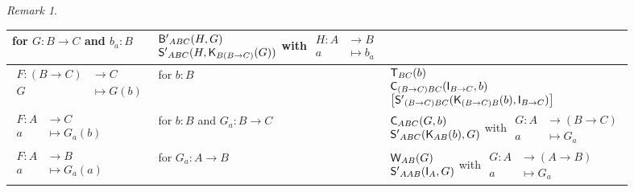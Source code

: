 \documentclass[a4paper]{article}
\theoremstyle{definition}
\theoremstyle{remark}
\newtheorem*{remark}{Remark}
\newcommand{\nm}{\mathsf}
\newcommand{\combinator}{\nm}
\newcommand{\idFun}{\combinator{I}}
\newcommand{\appFun}{\combinator{T}}
\newcommand{\constFun}{\combinator{K}}
\newcommand{\compFun}{\combinator{B'}}
\newcommand{\swapFun}{\combinator{C}}
\newcommand{\dupFun}{\combinator{W}}
\newcommand{\substFun}{\combinator{S'}}
\begin{document}
\begin{remark}
\begin{longtable}{ll|l}
    \parbox{3cm}{for $G : B \to C$ \\ and $b_a : B$} &
    $\begin{array}{@{}l@{}}
      \compFun_{ABC}(H,G)\\
      \substFun_{ABC}(H,\constFun_{B(B{\to}C)}(G))
    \end{array}$
    with
    $\begin{aligned}
      H : A &\to     B\\
          a &\mapsto b_a
    \end{aligned}$\\
    \hline
    \rule{0pt}{2.5em}
    $\begin{aligned}
      F : (B \to C) &\to     C\\
          G         &\mapsto G(b)
    \end{aligned}$ &
    for $b : B$ &
    $\begin{array}{@{}l@{}}
      \appFun_{BC}(b)\\
      \swapFun_{(B{\to}C)BC}(\idFun_{B{\to}C},b)\\
      \left[\substFun_{(B{\to}C)BC}(\constFun_{(B{\to}C)B}(b),\idFun_{B{\to}C})\right]
    \end{array}$\\
    \hline
    \rule{0pt}{2em}
    $\begin{aligned}
      F : A &\to     C\\
          a &\mapsto G_a(b)
    \end{aligned}$ &
    \parbox{3cm}{for $b : B$ \\ and $G_a : B \to C$} &
    $\begin{array}{@{}l@{}}
      \swapFun_{ABC}(G,b)\\
      \substFun_{ABC}(\constFun_{AB}(b),G)
    \end{array}$
    with
    $\begin{aligned}
      G : A &\to     (B \to C)\\
          a &\mapsto G_a
    \end{aligned}$\\
    \hline
    \rule{0pt}{2em}
    $\begin{aligned}
      F : A &\to     B\\
          a &\mapsto G_a(a)
    \end{aligned}$ &
    for $G_a : A \to B$ &
    $\begin{array}{@{}l@{}}
      \dupFun_{AB}(G)\\
      \substFun_{AAB}(\idFun_A,G)
    \end{array}$
    with
    $\begin{aligned}
      G : A &\to     (A \to B)\\
          a &\mapsto G_a
    \end{aligned}$
  \end{longtable}


\end{remark}
\end{document}
